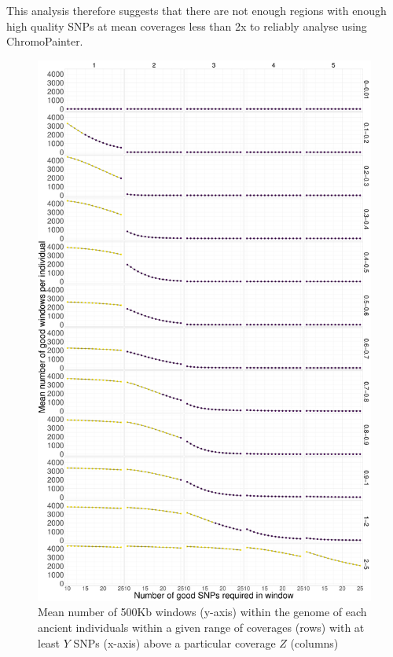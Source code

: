 This analysis therefore suggests that there are not enough regions with enough high quality SNPs at mean coverages less than 2x to reliably analyse using ChromoPainter.

\begin{figure}[htp]
    \centering
    \includegraphics[width=1.0\textwidth]{../images/chapter1/avg_good_windows.pdf}
    \caption{Mean number of 500Kb windows (y-axis) within the genome of each ancient individuals within a given range of coverages (rows) with at least $Y$ SNPs (x-axis) above a particular coverage $Z$ (columns)}
    \label{fig:avg_good_windows}
\end{figure}


